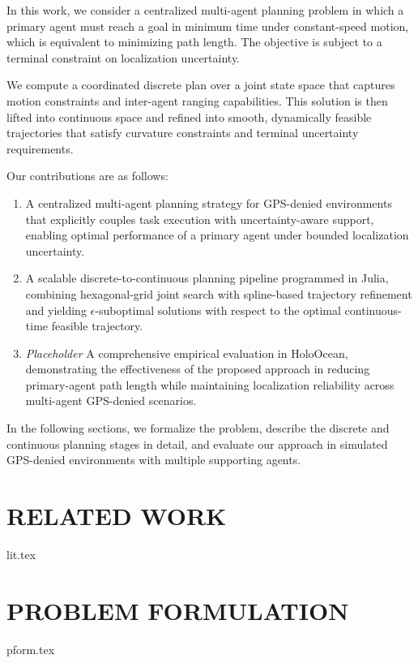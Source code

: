 \documentclass[letterpaper, 10 pt, conference]{ieeeconf}  %
\begin{document}
In this work, we consider a centralized multi-agent planning problem in which a primary agent must reach a goal in minimum time under constant-speed motion, which is equivalent to minimizing path length. The objective is subject to a terminal constraint on localization uncertainty.

We compute a coordinated discrete plan over a joint state space that captures motion constraints and inter-agent ranging capabilities. This solution is then lifted into continuous space and refined into smooth, dynamically feasible trajectories that satisfy curvature constraints and terminal uncertainty requirements.

Our contributions are as follows:
\begin{enumerate}
    \item A centralized multi-agent planning strategy for GPS-denied environments that explicitly couples task execution with uncertainty-aware support, enabling optimal performance of a primary agent under bounded localization uncertainty.
    
    \item A scalable discrete-to-continuous planning pipeline programmed in Julia, combining hexagonal-grid joint search with spline-based trajectory refinement and yielding $\epsilon$-suboptimal solutions with respect to the optimal continuous-time feasible trajectory.
    
    \item \emph{Placeholder} A comprehensive empirical evaluation in HoloOcean, demonstrating the effectiveness of the proposed approach in reducing primary-agent path length while maintaining localization reliability across multi-agent GPS-denied scenarios.
\end{enumerate}

In the following sections, we formalize the problem, describe the discrete and continuous planning stages in detail, and evaluate our approach in simulated GPS-denied environments with multiple supporting agents.

\section{RELATED WORK} \label{sec:2_rw}
{lit.tex}

\section{PROBLEM FORMULATION}  \label{sec:3_pf}
{pform.tex}
\end{document}
